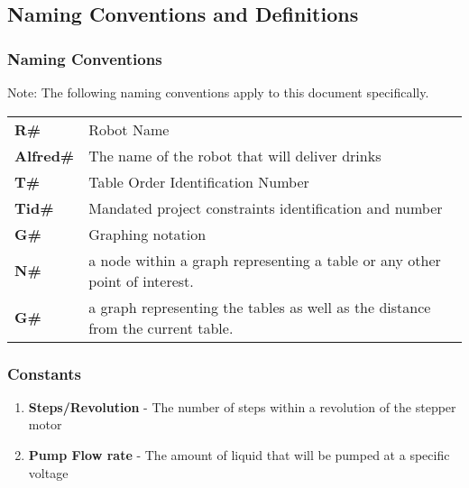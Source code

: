 \documentclass [11pt]{article}
\begin{document}
\subsection{Naming Conventions and Definitions}

\subsubsection{Naming Conventions}
Note: The following naming conventions apply to this document specifically. 
\begin{longtable}{ |p{ }  p{ }|}  \hline

\textbf{R\#} &  Robot Name\\ 

\cellcolor{tableCell}\textbf{Alfred\#} &  \cellcolor{tableCell} The name of the robot that will deliver drinks \\


\textbf{T\#} &  Table Order Identification Number\\ 

\cellcolor{tableCell}\textbf{Tid\#} &  \cellcolor{tableCell}Mandated project constraints identification and number \\

\textbf{G\#} & Graphing notation \\ 

\cellcolor{tableCell}\textbf{N\#}  & \cellcolor{tableCell} a node within a graph representing a table or any other point of interest. \\ 

\cellcolor{tableCell}\textbf{G\#}  & \cellcolor{tableCell} a graph representing the tables as well as the distance from the current table. \\ 

\end{longtable}

\subsubsection{Constants}
\begin{enumerate}
	\itemsep0pt
	\item \textbf{Steps/Revolution} -  The number of steps within a revolution of the stepper motor
	\item \textbf{Pump Flow rate} - The amount of liquid that will be pumped at a specific voltage
\end{enumerate}
\end{document}
